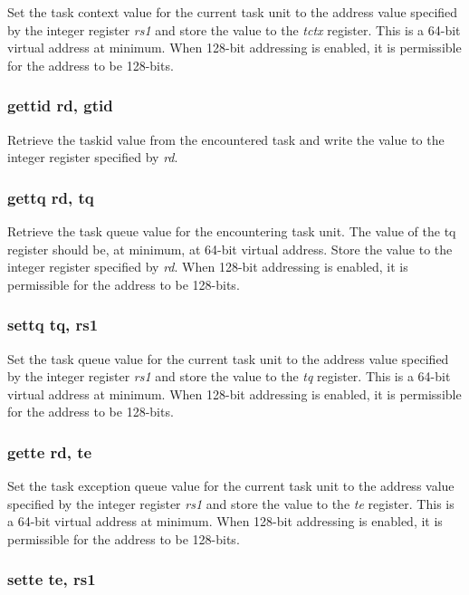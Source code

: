 \documentclass{article}
\begin{document}
Set the task context value for the current task unit to the address value
specified by the integer register \emph{rs1} and store the value to the
\emph{tctx} register.  This is a 64-bit virtual address at minimum.  
When 128-bit addressing is enabled, it is permissible for the address to be 128-bits.

\subsubsection{gettid rd, gtid}

Retrieve the taskid value from the encountered task and write the value
to the integer register specified by \emph{rd}.

\subsubsection{gettq rd, tq}

Retrieve the task queue value for the encountering task unit.  
The value of the tq register should be, at minimum, at 64-bit virtual
address.  Store the value to the integer register specified by \emph{rd}.  
When 128-bit addressing is enabled, it is permissible for the address to be 128-bits.

\subsubsection{settq tq, rs1}

Set the task queue value for the current task unit to the address value
specified by the integer register \emph{rs1} and store the value to the
\emph{tq} register.  This is a 64-bit virtual address at minimum.  
When 128-bit addressing is enabled, it is permissible for the address to be 128-bits.

\subsubsection{gette rd, te}

Set the task exception queue value for the current task unit to the address value
specified by the integer register \emph{rs1} and store the value to the
\emph{te} register.  This is a 64-bit virtual address at minimum.  
When 128-bit addressing is enabled, it is permissible for the address to be 128-bits.

\subsubsection{sette te, rs1}
\end{document}
